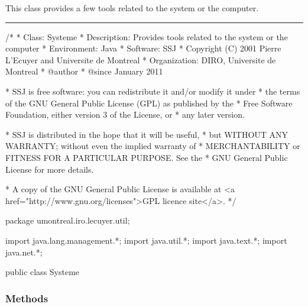 
This class provides a few tools related to the system
or the computer.




\bigskip\hrule

\begin{code}\begin{hide}
/*
 * Class:        Systeme
 * Description:  Provides tools related to the system or the computer
 * Environment:  Java
 * Software:     SSJ 
 * Copyright (C) 2001  Pierre L'Ecuyer and Universite de Montreal
 * Organization: DIRO, Universite de Montreal
 * @author       
 * @since        January 2011

 * SSJ is free software: you can redistribute it and/or modify it under
 * the terms of the GNU General Public License (GPL) as published by the
 * Free Software Foundation, either version 3 of the License, or
 * any later version.

 * SSJ is distributed in the hope that it will be useful,
 * but WITHOUT ANY WARRANTY; without even the implied warranty of
 * MERCHANTABILITY or FITNESS FOR A PARTICULAR PURPOSE.  See the
 * GNU General Public License for more details.

 * A copy of the GNU General Public License is available at
   <a href="http://www.gnu.org/licenses">GPL licence site</a>.
 */
\end{hide}
package umontreal.iro.lecuyer.util;\begin{hide}
   import java.lang.management.*;
   import java.util.*;
   import java.text.*;
   import java.net.*;
\end{hide}


public class Systeme\begin{hide} {
   private Systeme() {}
\end{hide}
\end{code}

\subsubsection* {Methods}

